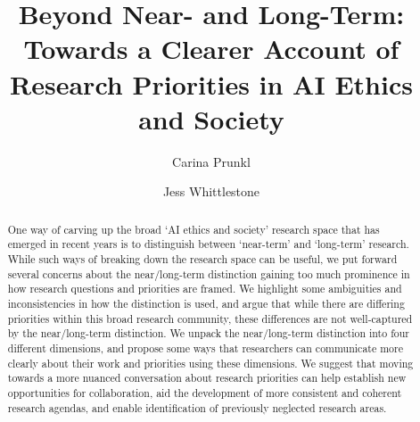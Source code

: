 \documentclass[sigconf]{acmart}
\begin{document}
\fancyhead{}


\title{Beyond Near- and Long-Term: Towards a Clearer Account of Research Priorities in AI Ethics and Society}


\author{Carina Prunkl}

\author{Jess Whittlestone}
\authornotemark[1]



%
\renewcommand{\shortauthors}{Prunkl and Whittlestone}



\begin{abstract}
One way of carving up the broad `AI ethics and society' research space that has emerged in recent years is to distinguish between `near-term' and `long-term' research. While such ways of breaking down the research space can be useful, we put forward several concerns about the near/long-term distinction gaining too much prominence in how research questions and priorities are framed. We highlight some ambiguities and inconsistencies in how the distinction is used, and argue that while there are differing priorities within this broad research community, these differences are not well-captured by the near/long-term distinction. We unpack the near/long-term distinction into four different dimensions, and propose some ways that researchers can communicate more clearly about their work and priorities using these dimensions. We suggest that moving towards a more nuanced conversation about research priorities can help establish new opportunities for collaboration, aid the development of more consistent and coherent research agendas, and enable identification of previously neglected research areas.
\end{abstract}
\end{document}
